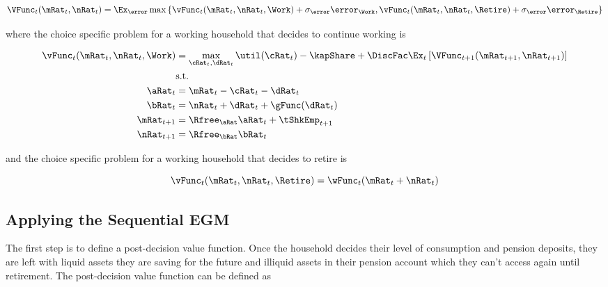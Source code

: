 \documentclass[\econtexRoot/SequentialEGM]{subfiles}
\begin{document}
\p

\begin{equation}
        \VFunc_{t}(\mRat_{t}, \nRat_{t}) = \Ex_\error \max \left\{
        \vFunc_{t}(\mRat_{t}, \nRat_{t}, \Work) + \sigma_{\error}
        \error_{\Work} ,
        \vFunc_{t}(\mRat_{t}, \nRat_{t}, \Retire) + \sigma_{\error}
        \error_{\Retire} \right\}
\end{equation}

where the choice specific problem for a working household that decides to
continue working is

\begin{equation}
        \begin{split}
                \vFunc_{t}(\mRat_{t}, \nRat_{t}, \Work) & = \max_{\cRat_{t},
                        \dRat_{t}} \util(\cRat_{t}) - \kapShare + \DiscFac
                \Ex_{t} \left[
                        \VFunc_{t+1}(\mRat_{t+1}, \nRat_{t+1})
                        \right] \\
                & \text{s.t.} \\
                \aRat_{t} & = \mRat_{t} - \cRat_{t} - \dRat_{t} \\
                \bRat_{t} & = \nRat_{t} + \dRat_{t} + \gFunc(\dRat_{t}) \\
                \mRat_{t+1} & = \Rfree_{\aRat} \aRat_{t} + \tShkEmp_{t+1} \\
                \nRat_{t+1} & = \Rfree_{\bRat} \bRat_{t}
        \end{split}
\end{equation}

and the choice specific problem for a working household that decides to retire
is

\begin{equation}
        \vFunc_{t}(\mRat_{t}, \nRat_{t}, \Retire) =
        \wFunc_{t}(\mRat_{t}+\nRat_{t})
\end{equation}

\subsection{Applying the Sequential EGM}

The first step is to define a post-decision value function. Once the household
decides their level of consumption and pension deposits, they are left with
liquid assets they are saving for the future and illiquid assets in their
pension account which they can't access again until retirement. The
post-decision value function can be defined as
\end{document}
